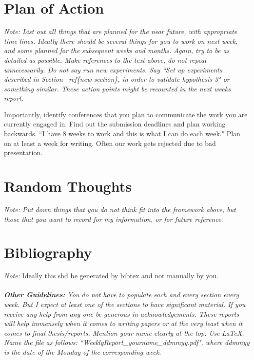 \documentclass{article}
\begin{document}
\section{Plan of Action}
{\it Note: List out all things that are planned for the near future, with
appropriate time lines. Ideally there should be several things for you to
work on next week, and some planned for the subsequent weeks and months.
Again, try to be as detailed as possible. Make references to the text above,
do not repeat unnecessarily. Do not say run new experiments. Say ``Set up
experiments described in Section \ ref\{new-section\}, in order to validate
hypothesis 3" or something similar. These action points might be recounted
in the next weeks report. 

Importantly, identify conferences that you plan to communicate the work you
are currently engaged in. Find out the submission deadlines and plan working
backwards. ``I have 8 weeks to work and this is what I can do each week." Plan
on at least a week for writing. Often our work gets rejected due to bad
presentation.}

\section{Random Thoughts}
{\it Note: Put down things that you do not think fit into the framework
above, but those that you want to record for my information, or for future
reference. }

\section{Bibliography}
{\it Note:} Ideally this shd be generated by bibtex and not manually by
you.\\
 \\

{\it {\bf Other Guidelines:} You do not have to populate each and every section
every week. But I expect at least one of the sections to have significant
material. If you receive any help from any one be generous in
acknowledgements. These reports will help immensely when it comes to writing
papers or at the very least when it comes to final thesis/reports. Mention
your name clearly at the top. Use LaTeX. Name the file as follows:
``WeeklyReport\_yourname\_ddmmyy.pdf", where ddmmyy is the date of the Monday
of the corresponding week.}

\nocite{langley00}



\end{document}
